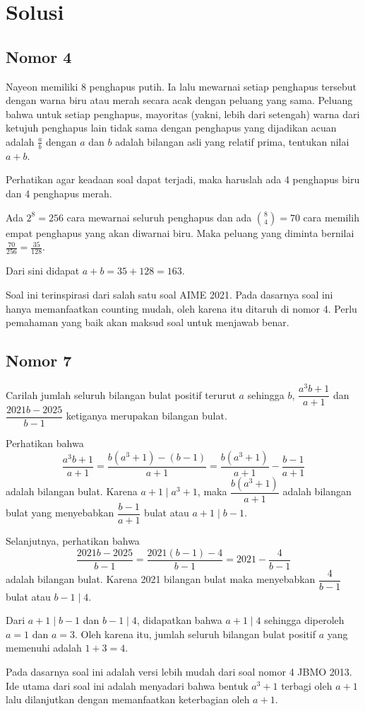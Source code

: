 \section{Solusi}
\subsection{Nomor 4}
Nayeon memiliki 8 penghapus putih. Ia lalu mewarnai setiap penghapus tersebut dengan warna biru atau merah secara acak dengan peluang yang sama. Peluang bahwa untuk setiap penghapus, mayoritas (yakni, lebih dari setengah) warna dari ketujuh penghapus lain tidak sama dengan penghapus yang dijadikan acuan adalah $\frac{a}{b}$ dengan $a$ dan $b$ adalah bilangan asli yang relatif prima, tentukan nilai $a+b$.
\begin{jawaban}
Perhatikan agar keadaan soal dapat terjadi, maka haruslah ada 4 penghapus biru dan 4 penghapus merah.

Ada $2^{8} = 256$ cara mewarnai seluruh penghapus dan ada ${8 \choose 4} = 70$ cara memilih empat penghapus yang akan diwarnai biru. Maka peluang yang diminta bernilai $\frac{70}{256}=\frac{35}{128}$.

Dari sini didapat $a+b = 35+128 = \boxed{163}$.
\end{jawaban}
\begin{remark}
Soal ini terinspirasi dari salah satu soal AIME 2021. Pada dasarnya soal ini hanya memanfaatkan counting mudah, oleh karena itu ditaruh di nomor 4. Perlu pemahaman yang baik akan maksud soal untuk menjawab benar.
\end{remark}

\newpage 
\subsection{Nomor 7}  Carilah jumlah seluruh bilangan bulat positif terurut $a$ sehingga $b$, $\dfrac{a^3b+1}{a+1}$ dan $\dfrac{2021b-2025}{b-1}$ ketiganya merupakan bilangan bulat.

\begin{jawaban}
Perhatikan bahwa $$\dfrac{a^3b+1}{a+1}=\dfrac{b(a^3+1)-(b-1)}{a+1} =\dfrac{b(a^3+1)}{a+1}-\dfrac{b-1}{a+1}$$ adalah bilangan bulat. Karena $a+1 \mid a^3+1$, maka $\dfrac{b(a^3+1)}{a+1}$ adalah bilangan bulat yang menyebabkan $\dfrac{b-1}{a+1}$ bulat atau $a+1 \mid b-1$.
			
			Selanjutnya, perhatikan bahwa $$\dfrac{2021b-2025}{b-1}=\dfrac{2021(b-1)-4}{b-1}=2021-\dfrac{4}{b-1}$$ adalah bilangan bulat. Karena 2021 bilangan bulat maka menyebabkan $\dfrac{4}{b-1}$ bulat atau $b-1 \mid 4$. 
			
			Dari $a+1 \mid b-1$ dan $b-1 \mid 4$, didapatkan bahwa $a+1 \mid 4$ sehingga diperoleh $a=1$ dan $a=3$. Oleh karena itu, jumlah seluruh bilangan bulat positif $a$ yang memenuhi adalah $1+3=\boxed{4}$.
\end{jawaban}
\begin{remark}
Pada dasarnya soal ini adalah versi lebih mudah dari soal nomor 4 JBMO 2013. Ide utama dari soal ini adalah menyadari bahwa bentuk $a^3+1$ terbagi oleh $a+1$ lalu dilanjutkan dengan memanfaatkan keterbagian oleh $a+1$.
\end{remark}

